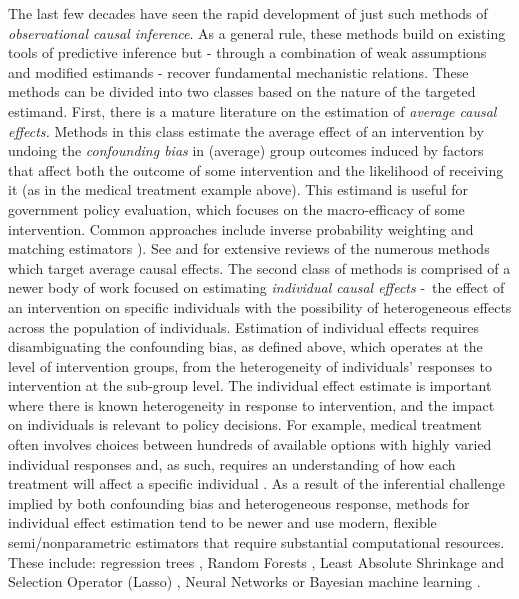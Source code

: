 \documentclass[../main.tex]{subfiles}
\begin{document}
\vspace{\baselineskip}
The last few decades have seen the rapid development of just such methods of \textit{observational causal inference}. As a general rule, these methods build on existing tools of predictive inference but - through a combination of weak assumptions and modified estimands - recover fundamental mechanistic relations. These methods can be divided into two classes based on the nature of the targeted estimand. First, there is a mature literature on the estimation of \textit{average causal effects. }Methods in this class estimate the average effect of an intervention by undoing the \textit{confounding bias} in (average) group outcomes induced by factors that affect both the outcome of some intervention and the likelihood of receiving it (as in the medical treatment example above). This estimand is useful for government policy evaluation, which focuses on the macro-efficacy of some intervention. Common approaches include inverse probability weighting \parencite{Horvitz1952AUniverse, Hirano2003EfficientScore} and matching estimators \parencite{Rubin1974EstimatingStudies, Rosenbaum1983TheEffects}). See \textcite{Imbens2009RecentEvaluation} and \textcite{Athey2017TheEvaluation} for extensive reviews of the numerous methods which target average causal effects. The second class of methods is comprised of a newer body of work focused on estimating \textit{individual causal effects }-\ the effect of an intervention on specific individuals with the possibility of heterogeneous effects across the population of individuals. Estimation of individual effects requires disambiguating the confounding bias, as defined above, which operates at the level of intervention groups, from the heterogeneity of individuals’ responses to intervention at the sub-group level. The individual effect estimate is important where there is known heterogeneity in response to intervention, and the impact on individuals is relevant to policy decisions. For example, medical treatment often involves choices between hundreds of available options with highly varied individual responses and, as such, requires an understanding of how each treatment will affect a specific individual \parencite{Lu2018EstimatingMethods}. As a result of the inferential challenge implied by both confounding bias and heterogeneous response, methods for individual effect estimation tend to be newer and use modern, flexible semi/nonparametric estimators that require substantial computational resources. These include: regression trees \parencite{Su2009SubgroupTsai, Athey2016RecursiveEffects}, Random Forests \parencite{Wager2018EstimationForests, Athey2019GeneralizedForests}, Least Absolute Shrinkage and Selection Operator (Lasso) \parencite{Qian2011PerformanceRules, Tian2014ACovariates, Chen2017AScoring}, Neural Networks  \parencite{Johansson2016LearningInference, Johansson2018LearningDesigns, Schwab2018PerfectNetworks, Li2017MatchingEstimation, Kunzel2018TransferNetworks} or Bayesian machine learning \parencite{Hill2011BayesianInference, Taddy2016AExperimentation}.
\end{document}
